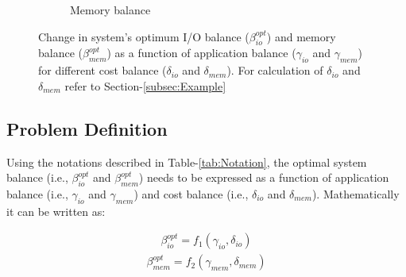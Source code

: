 \documentclass[journal]{IEEEtran}
\begin{document}
\begin{figure}[htb]
\begin{subfigure}[b]{0.48\textwidth}
                \caption{Memory balance}
                \label{fig:beta_mem}
   \end{subfigure}
   \caption{Change in system's optimum I/O balance ($\beta_{io}^{opt}$) and memory balance ($\beta_{mem}^{opt}$) as a function of application balance ($\gamma_{io}$ and $\gamma_{mem}$) for different cost balance ($\delta_{io}$ and $\delta_{mem}$). For calculation of $\delta_{io}$ and $\delta_{mem}$ refer to Section-\ref{subsec:Example}}
  \label{fig:BetaVsGamma}
\end{figure}
\subsection{Problem Definition}
Using the notations described in Table-\ref{tab:Notation}, the optimal system balance (i.e., $\beta_{io}^{opt}$ and $\beta_{mem}^{opt}$) needs to be expressed as a function of application balance (i.e., $\gamma_{io}$ and $\gamma_{mem}$) and cost balance (i.e., $\delta_{io}$ and $\delta_{mem}$). Mathematically it can be written as:

\begin{equation} \label{eqn:BalancedIONotation}
\begin{split}
\beta_{io}^{opt} = f_1(\gamma_{io}, \delta_{io})
\end{split}
\end{equation}
\begin{equation} \label{eqn:BalancedMemNotation}
\begin{split}
\beta_{mem}^{opt} = f_2(\gamma_{mem}, \delta_{mem})
\end{split}
\end{equation}
\end{document}
